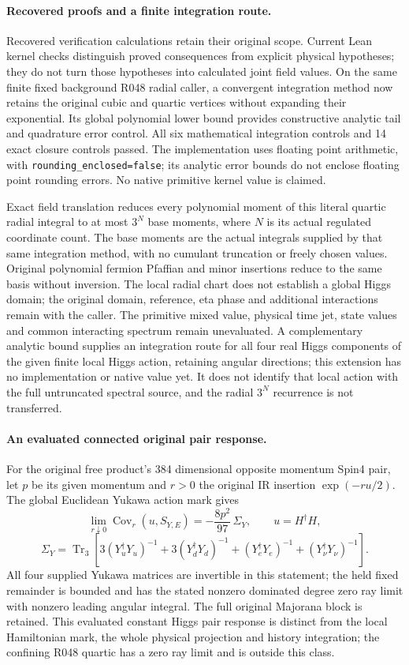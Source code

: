 \paragraph{Recovered proofs and a finite integration route.}
Recovered verification calculations retain their original scope.
Current Lean kernel checks distinguish proved consequences from explicit
physical hypotheses; they do not turn those hypotheses into calculated
joint field values.
On the same finite fixed background R048 radial caller, a convergent
integration method now retains the original cubic and quartic vertices
without expanding their exponential. Its global polynomial lower bound
provides constructive analytic tail and quadrature error control.
All six mathematical integration controls and 14 exact closure controls
passed. The implementation uses floating point arithmetic, with
\texttt{rounding\_enclosed=false}; its analytic error bounds do not enclose
floating point rounding errors. No native primitive kernel value is claimed.

Exact field translation reduces every polynomial moment of this literal
quartic radial integral to at most \(3^N\) base moments, where \(N\) is
its actual regulated coordinate count. The base moments are the actual
integrals supplied by that same integration method, with no cumulant
truncation or freely chosen values. Original polynomial fermion Pfaffian
and minor insertions reduce to the same basis without inversion.
The local radial chart does not establish a global Higgs domain;
the original domain, reference, eta phase and additional interactions
remain with the caller. The primitive mixed value, physical time jet,
state values and common interacting spectrum remain unevaluated.
A complementary analytic bound supplies an integration route for all four
real Higgs components of the given finite local Higgs action, retaining
angular directions; this extension has no implementation or native value yet.
It does not identify that local action with the full untruncated spectral
source, and the radial \(3^N\) recurrence is not transferred.

\paragraph{An evaluated connected original pair response.}
For the original free product's 384 dimensional opposite momentum
Spin4 pair, let \(p\) be its given momentum and \(r>0\) the original
IR insertion \(\exp(-ru/2)\). The global Euclidean Yukawa action mark gives
\[
\lim_{r\downarrow0}\operatorname{Cov}_r(u,S_{Y,E})
=-\frac{8p^2}{97}\,\Sigma_Y,
\qquad u=H^\dagger H,
\]
\[
\Sigma_Y=\operatorname{Tr}_3\!\left[
3(Y_u^\dagger Y_u)^{-1}+3(Y_d^\dagger Y_d)^{-1}
+(Y_e^\dagger Y_e)^{-1}+(Y_\nu^\dagger Y_\nu)^{-1}\right].
\]
All four supplied Yukawa matrices are invertible in this statement;
the held fixed remainder is bounded and has the stated nonzero dominated
degree zero ray limit with nonzero leading angular integral.
The full original Majorana block is retained.
This evaluated constant Higgs pair response is distinct from the local
Hamiltonian mark, the whole physical projection and history integration;
the confining R048 quartic has a zero ray limit and is outside this class.

